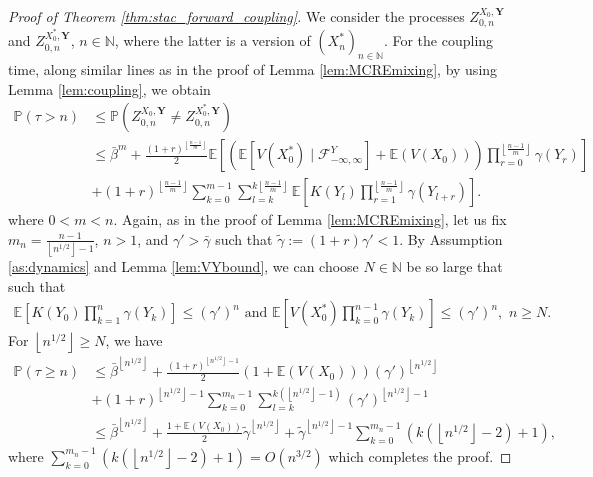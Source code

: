 \documentclass[a4paper,10pt]{article}
\newcommand{\N}{\mathbb{N}}
\newcommand{\F}{\mathcal{F}}
\renewcommand{\P}{\mathbb{P}}
\newcommand{\E}{\mathbb{E}}
\newcommand{\ga}{\gamma}
\newcommand{\lfrf}[1]{\left\lfloor #1\right\rfloor}
\begin{document}
\begin{proof}[Proof of Theorem \ref{thm:stac_forward_coupling}]
We consider the processes $Z_{0,n}^{X_0,\mathbf{Y}}$ and $Z_{0,n}^{X_0^\ast,\mathbf{Y}}$, $n\in\N$, where the latter is a version of $(X_n^\ast)_{n\in\N}$.
For the coupling time, along similar lines as in the proof of Lemma \ref{lem:MCREmixing}, 
by using Lemma \ref{lem:coupling}, we obtain
\begin{align*}
	\P (\tau> n)&\le \P \left(Z_{0,n}^{X_0,\mathbf{Y}}\ne Z_{0,n}^{X_0^\ast,\mathbf{Y}}\right) 
	\\
	&\le
	 \bar{\beta}^m
	+ 
	\frac{(1+r)^{\lfrf{\frac{n-1}{m}}}}{2}
	\E\left[
	\left(
	\E \left[V(X_0^\ast)\mid \F_{-\infty,\infty}^Y\right]+\E (V(X_0))\right)
	\prod_{r=0}^{\lfrf{\frac{n-1}{m}}}\ga (Y_{r})
	\right]
	\\
	&+
	(1+r)^{\lfrf{\frac{n-1}{m}}}
	\sum_{k=0}^{m-1}\sum_{l=k}^{k\lfrf{\frac{n-1}{m}}} \E\left[K(Y_{l})\prod_{r=1}^{\lfrf{\frac{n-1}{m}}}\ga (Y_{l+r})
	\right].
\end{align*}
where $0<m<n$. Again, as in the proof of Lemma \ref{lem:MCREmixing}, let us fix $m_n=\frac{n-1}{\lfrf{n^{1/2}}-1}$, $n>1$, and $\ga'>\bar{\ga}$ such that $\tilde{\ga}:=(1+r)\ga'<1$. 
By Assumption \ref{as:dynamics} and Lemma \ref{lem:VYbound}, we can choose $N\in\N$ be so large that such that
\begin{align*}
	\E\left[K(Y_0)\prod_{k=1}^n \ga (Y_k)\right]\le (\ga')^n
	\,\,\text{and}\,\,
	\E\left[V(X_0^\ast)\prod_{k=0}^{n-1} \ga (Y_k)\right]\le (\ga')^n,\,\,n\ge N.
\end{align*}
For $\lfrf{n^{1/2}}\ge N$, we have
\begin{align*}
	\P (\tau\ge n)
	&\le 
	\bar{\beta}^{\lfrf{n^{1/2}}}+\frac{(1+r)^{\lfrf{n^{1/2}}-1}}{2}
	\left(
	1+\E(V(X_0))
	\right)(\ga')^{\lfrf{n^{1/2}}}\\
	&+
	(1+r)^{\lfrf{n^{1/2}}-1}
	\sum_{k=0}^{m_n-1}\sum_{l=k}^{k(\lfrf{n^{1/2}}-1)}
	(\ga')^{\lfrf{n^{1/2}}-1}
	\\
	&\le
	\bar{\beta}^{\lfrf{n^{1/2}}}
	+
	\frac{1+\E (V(X_0))}{2}\tilde{\ga}^{\lfrf{n^{1/2}}}
	+
	\tilde{\ga}^{\lfrf{n^{1/2}}-1}\sum_{k=0}^{m_n-1}(k(\lfrf{n^{1/2}}-2)+1),
\end{align*}
where $\sum_{k=0}^{m_n-1}(k(\lfrf{n^{1/2}}-2)+1)=O(n^{3/2})$ which completes the proof.   	
\end{proof}
\end{document}
